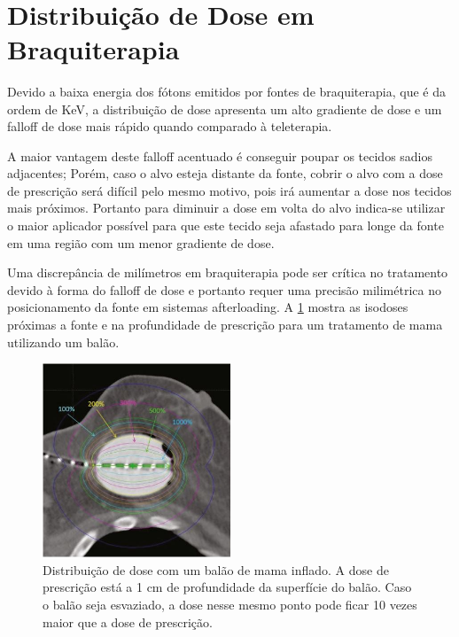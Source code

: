 \documentclass[11pt,a4paper]{article}
\begin{document}
		\

	\section{Distribuição de Dose em Braquiterapia}

		Devido a baixa energia dos fótons emitidos por fontes de braquiterapia, que é da ordem de KeV, a distribuição de dose apresenta um alto gradiente de dose e um falloff de dose mais rápido quando comparado à teleterapia.

		A maior vantagem deste falloff acentuado é conseguir poupar os tecidos sadios adjacentes; Porém, caso o alvo esteja distante da fonte, cobrir o alvo com a dose de prescrição será difícil pelo mesmo motivo, pois irá aumentar a dose nos tecidos mais próximos. Portanto para diminuir a dose em volta do alvo indica-se utilizar o maior aplicador possível para que este tecido seja afastado para longe da fonte em uma região com um menor gradiente de dose. 

		Uma discrepância de milímetros em braquiterapia pode ser crítica no tratamento devido à forma do falloff de dose e portanto requer uma precisão milimétrica no posicionamento da fonte em sistemas afterloading. A    \ref{img:DistribuicaoDoseBalao} mostra as isodoses próximas a fonte e na profundidade de prescrição para um tratamento de mama utilizando um balão.

		\begin{figure}[h]
			\centering
			\includegraphics[width=0.5\textwidth]{Imagens/falloffDoseMammosite.JPG}
			\caption{Distribuição de dose com um balão de mama inflado. A dose de prescrição está a 1 cm de profundidade da superfície do balão. Caso o balão seja esvaziado, a dose nesse mesmo ponto pode ficar 10 vezes maior que a dose de prescrição.}
			\label{img:DistribuicaoDoseBalao}
		\end{figure}
\end{document}

